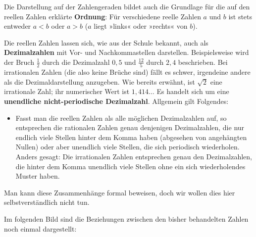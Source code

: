 Die Darstellung auf der Zahlengeraden bildet auch die Grundlage für die auf den reellen Zahlen erklärte \textbf{Ordnung}: Für verschiedene reelle Zahlen $a$ und $b$ ist stets entweder $a < b$ oder $a > b$ ($a$ liegt »links« oder »rechts« von $b$).

Die reellen Zahlen lassen sich, wie aus der Schule bekannt, auch als \textbf{Dezimalzahlen} mit Vor- und Nachkommastellen darstellen. Beispielsweise wird der Bruch $\tfrac{1}{2}$ durch die Dezimalzahl $0{,}5$ und $\tfrac{12}{5}$ durch $2{,}4$ beschrieben. Bei irrationalen Zahlen (die also keine Brüche sind) fällt es schwer, irgendeine andere als die Dezimaldarstellung anzugeben. Wie bereits erwähnt, ist $\sqrt{2}$ eine irrationale Zahl; ihr numerischer Wert ist $1{,}414\ldots$ Es handelt sich um eine \textbf{unendliche nicht-periodische Dezimalzahl}. Allgemein gilt Folgendes:
\begin{itemize}
  \item Fasst man die reellen Zahlen als alle möglichen Dezimalzahlen auf, so entsprechen die rationalen Zahlen genau denjenigen Dezimalzahlen, die nur endlich viele Stellen hinter dem Komma haben (abgesehen von angehängten Nullen) oder aber unendlich viele Stellen, die sich periodisch wiederholen. Anders gesagt: Die irrationalen Zahlen entsprechen genau den Dezimalzahlen, die hinter dem Komma unendlich viele Stellen ohne ein sich wiederholendes Muster haben.
\end{itemize}

Man kann diese Zusammenhänge formal beweisen, doch wir wollen dies hier selbstverständlich nicht tun.

Im folgenden Bild sind die Beziehungen zwischen den bisher behandelten Zahlen noch einmal dargestellt:

\begin{center}
\end{center}

